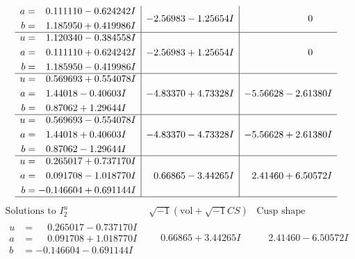 \documentclass[1p]{elsarticle_modified}
\theoremstyle{definition}
\newcommand{\I}{\sqrt{-1}}
\begin{document}
$$\begin{array}{c|c|c}
\begin{aligned}
a &= \phantom{-}0.111110 - 0.624242 I \\
b &= \phantom{-}1.185950 + 0.419986 I\end{aligned}
 & -2.56983 - 1.25654 I & \phantom{-0.000000 } 0 \\ \hline\begin{aligned}
u &= \phantom{-}1.120340 - 0.384558 I \\
a &= \phantom{-}0.111110 + 0.624242 I \\
b &= \phantom{-}1.185950 - 0.419986 I\end{aligned}
 & -2.56983 + 1.25654 I & \phantom{-0.000000 } 0 \\ \hline\begin{aligned}
u &= \phantom{-}0.569693 + 0.554078 I \\
a &= \phantom{-}1.44018 - 0.40603 I \\
b &= \phantom{-}0.87062 + 1.29644 I\end{aligned}
 & -4.83370 + 4.73328 I & -5.56628 - 2.61380 I \\ \hline\begin{aligned}
u &= \phantom{-}0.569693 - 0.554078 I \\
a &= \phantom{-}1.44018 + 0.40603 I \\
b &= \phantom{-}0.87062 - 1.29644 I\end{aligned}
 & -4.83370 - 4.73328 I & -5.56628 + 2.61380 I \\ \hline\begin{aligned}
u &= \phantom{-}0.265017 + 0.737170 I \\
a &= \phantom{-}0.091708 - 1.018770 I \\
b &= -0.146604 + 0.691144 I\end{aligned}
 & \phantom{-}0.66865 - 3.44265 I & \phantom{-}2.41460 + 6.50572 I\\
 \hline 
 \end{array}$$\newpage$$\begin{array}{c|c|c}  
\text{Solutions to }I^u_{2}& \I (\text{vol} + \sqrt{-1}CS) & \text{Cusp shape}\\
 \hline 
\begin{aligned}
u &= \phantom{-}0.265017 - 0.737170 I \\
a &= \phantom{-}0.091708 + 1.018770 I \\
b &= -0.146604 - 0.691144 I\end{aligned}
 & \phantom{-}0.66865 + 3.44265 I & \phantom{-}2.41460 - 6.50572 I \\ \hline\begin{aligned}

\end{aligned}
\end{array}$$
\end{document}
